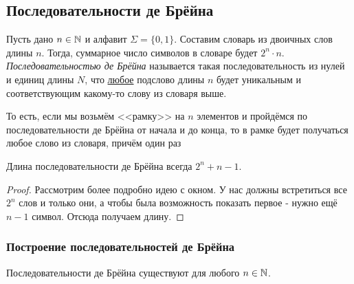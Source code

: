 \subsection*{Последовательности де Брёйна}

\begin{definition}
	Пусть дано $n \in \mathbb{N}$ и алфавит $\Sigma = \{0, 1\}$. Составим словарь из двоичных слов длины $n$. Тогда, суммарное число символов в словаре будет $2^n \cdot n$. \textit{Последовательностью де Брёйна} называется такая последовательность из нулей и единиц длины $N$, что \underline{любое} подслово длины $n$ будет уникальным и соответствующим какому-то слову из словаря выше.
\end{definition}

\begin{note}
	То есть, если мы возьмём <<рамку>> на $n$ элементов и пройдёмся по последовательности де Брёйна от начала и до конца, то в рамке будет получаться любое слово из словаря, причём один раз
\end{note}

\begin{proposition}
	Длина последовательности де Брёйна всегда $2^n + n - 1$.
\end{proposition}

\begin{proof}
	Рассмотрим более подробно идею с окном. У нас должны встретиться все $2^n$ слов и только они, а чтобы была возможность показать первое - нужно ещё $n - 1$ символ. Отсюда получаем длину.
\end{proof}

\subsubsection*{Построение последовательностей де Брёйна}

\begin{theorem}
	Последовательности де Брёйна существуют для любого $n \in \mathbb{N}$.
\end{theorem}

